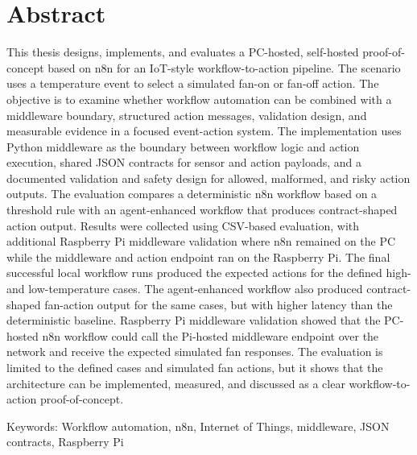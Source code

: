 

\section*{Abstract}\label{sec:abstract}

This thesis designs, implements, and evaluates a PC-hosted, self-hosted proof-of-concept based on n8n for an IoT-style workflow-to-action pipeline. The scenario uses a temperature event to select a simulated fan-on or fan-off action. The objective is to examine whether workflow automation can be combined with a middleware boundary, structured action messages, validation design, and measurable evidence in a focused event-action system. The implementation uses Python middleware as the boundary between workflow logic and action execution, shared JSON contracts for sensor and action payloads, and a documented validation and safety design for allowed, malformed, and risky action outputs. The evaluation compares a deterministic n8n workflow based on a threshold rule with an agent-enhanced workflow that produces contract-shaped action output. Results were collected using CSV-based evaluation, with additional Raspberry Pi middleware validation where n8n remained on the PC while the middleware and action endpoint ran on the Raspberry Pi. The final successful local workflow runs produced the expected actions for the defined high- and low-temperature cases. The agent-enhanced workflow also produced contract-shaped fan-action output for the same cases, but with higher latency than the deterministic baseline. Raspberry Pi middleware validation showed that the PC-hosted n8n workflow could call the Pi-hosted middleware endpoint over the network and receive the expected simulated fan responses. The evaluation is limited to the defined cases and simulated fan actions, but it shows that the architecture can be implemented, measured, and discussed as a clear workflow-to-action proof-of-concept.

Keywords: Workflow automation, n8n, Internet of Things, middleware, JSON contracts, Raspberry Pi